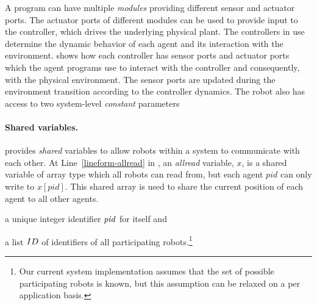 A \lgname program can have multiple \emph{modules} providing different sensor and actuator ports.
The actuator ports of different modules can be used to provide input to the controller, which drives the underlying physical plant.
The controllers in use determine the dynamic behavior of each agent and its interaction with the environment.
 shows how each controller has sensor ports and actuator ports which the agent programs use to interact with the controller and consequently, with the physical environment.
The sensor ports are updated during the environment transition according to the controller dynamics.
%
The robot also has access to two system-level \emph{constant} parameters


\paragraph{Shared variables.}
\lgname provides \emph{shared} variables to allow robots within a system to communicate with each other.
At Line~\ref{lineform-allread} in , an \emph{allread} variable, $x$, is a shared variable of array type which all robots can read from,
but each agent $pid$ can only write to $x[pid]$.
This shared array is used to share the current position of each agent to all other agents.





\begin{inparaenum}[(a)]
\item a unique integer identifier $\mathit{pid}$ for itself and
\item a list $ID$ of identifiers of all participating robots.\footnote{Our current system implementation assumes that the set of possible participating robots is known, but this assumption can be relaxed on a per application basis.}
\end{inparaenum}

